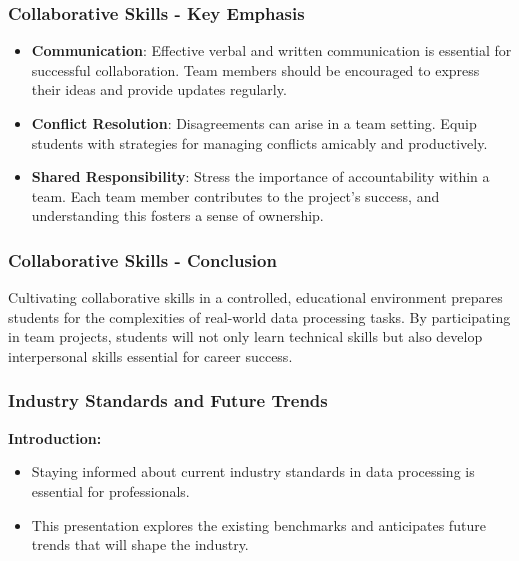 \documentclass[aspectratio=169]{beamer}
\begin{document}
\begin{frame}[fragile]
    \frametitle{Collaborative Skills - Key Emphasis}
    \begin{itemize}
        \item \textbf{Communication}: Effective verbal and written communication is essential for successful collaboration. 
        Team members should be encouraged to express their ideas and provide updates regularly.
        
        \item \textbf{Conflict Resolution}: Disagreements can arise in a team setting. 
        Equip students with strategies for managing conflicts amicably and productively.
        
        \item \textbf{Shared Responsibility}: Stress the importance of accountability within a team. 
        Each team member contributes to the project's success, and understanding this fosters a sense of ownership.
    \end{itemize}
\end{frame}

\begin{frame}[fragile]
    \frametitle{Collaborative Skills - Conclusion}
    Cultivating collaborative skills in a controlled, educational environment prepares students for the complexities of real-world data processing tasks. 
    By participating in team projects, students will not only learn technical skills but also develop interpersonal skills essential for career success.
\end{frame}

\begin{frame}[fragile]
    \frametitle{Industry Standards and Future Trends}
    \textbf{Introduction:}
    \begin{itemize}
        \item Staying informed about current industry standards in data processing is essential for professionals.
        \item This presentation explores the existing benchmarks and anticipates future trends that will shape the industry.
    \end{itemize}
\end{frame}
\end{document}
